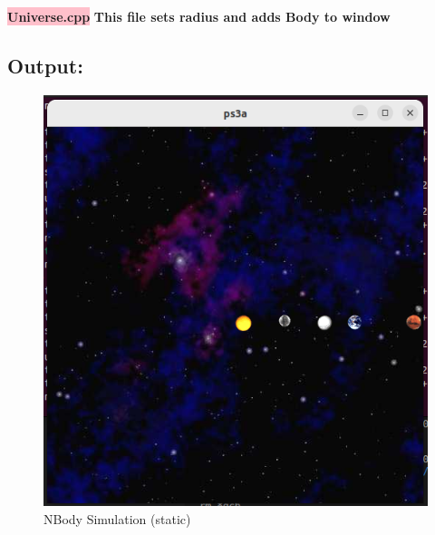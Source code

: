 \textbf{\colorbox{pink}{Universe.cpp}} \newline \textbf{This file sets radius and adds Body to window}



\newpage
\subsection{Output:}\label{sec:ps3a:output}
\begin{figure}[h]
    \centering
    \includegraphics[width=1\textwidth]{ps3a/screenshot.png}
    \caption{NBody Simulation (static)}
    \label{fig:ps3a}
\end{figure}

\newpage
